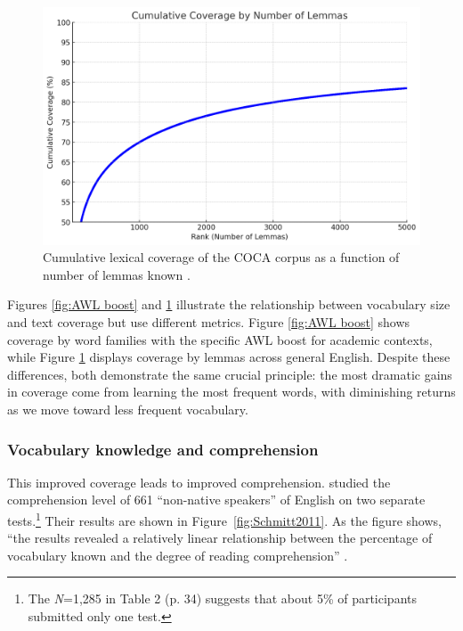 \begin{figure}
    \centering
    \includegraphics[width=0.8\linewidth]{figures/cumulative-lemmas.png}
    \caption{Cumulative lexical coverage of the COCA corpus as a function of number of lemmas known \citep{wordfrequency_info}.}
    \label{fig:lemma-coverage}
\end{figure}

Figures \ref{fig:AWL boost} and \ref{fig:lemma-coverage} illustrate the relationship between vocabulary size and text coverage but use different metrics. Figure \ref{fig:AWL boost} shows coverage by word families with the specific AWL boost for academic contexts, while Figure \ref{fig:lemma-coverage} displays coverage by lemmas across general English. Despite these differences, both demonstrate the same crucial principle: the most dramatic gains in coverage come from learning the most frequent words, with diminishing returns as we move toward less frequent vocabulary.

\subsubsection*{Vocabulary knowledge and comprehension}

This improved coverage leads to improved comprehension. \citet{Schmitt2011} studied the comprehension level of 661 ``non-native speakers'' of English on two separate tests.\footnote{The \textit{N}=1,285 in Table 2 (p. 34) suggests that about 5\% of participants submitted only one test.} Their results are shown in Figure~\ref{fig:Schmitt2011}. As the figure shows, ``the results revealed a relatively linear relationship between the percentage of vocabulary known and the degree of reading comprehension'' \citep[26]{Schmitt2011}.

